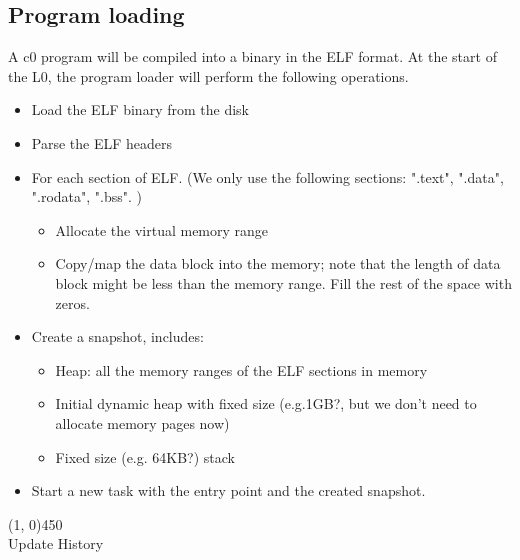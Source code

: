 \documentclass[a4paper]{article}
\begin{document}
{\subsection{Program loading}}

A c0 program will be compiled into a binary in the ELF format.
At the start of the L0, the program loader will perform the following operations.

\begin{itemize}
	\item Load the ELF binary from the disk
	\item Parse the ELF headers
	\item For each section of ELF. (We only use the following sections: ".text", ".data", ".rodata", ".bss". )
		\begin{itemize}
			\item Allocate the virtual memory range
			\item Copy/map the data block into the memory; note that the length of data block might be less than the memory range. Fill the rest of the space with zeros.
		\end{itemize}
	\item Create a snapshot, includes:
		\begin{itemize}
			\item Heap: all the memory ranges of the ELF sections in memory
			\item Initial dynamic heap with fixed size (e.g.1GB?, but we don't need to allocate memory pages now)
			\item Fixed size (e.g. 64KB?) stack
		\end{itemize}
	\item Start a new task with the entry point and the created snapshot.
\end{itemize}


\line(1, 0){450}\\

Update History\\
\end{document}
